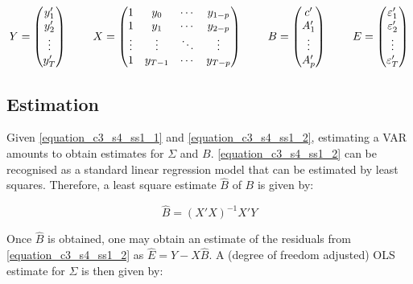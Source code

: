 \begin{equation}
Y = \left( \begin{matrix} y_1' \\ y_2' \\ \vdots \\ y_T' \end{matrix} \right) \hspace{8mm}
X = \left( \begin{matrix} 1 & y_0 & \cdots & y_{1-p} \\ 1 & y_1 & \cdots & y_{2-p} \\ \vdots & \vdots & \ddots & \vdots \\ 1 & y_{T-1} & \cdots & y_{T-p} \end{matrix} \right) \hspace{8mm}
B = \left( \begin{matrix} c' \\ A_1' \\ \vdots \\ A_p' \end{matrix} \right) \hspace{8mm}
E = \left( \begin{matrix} \varepsilon_1' \\ \varepsilon_2' \\ \vdots \\ \varepsilon_T' \end{matrix} \right)
\label{equation_c3_s4_ss1_3}
\end{equation}

\newpage

\subsection{Estimation}
\label{chapter3_section4_subsection2}


Given \ref{equation_c3_s4_ss1_1} and \ref{equation_c3_s4_ss1_2}, estimating a VAR amounts to obtain estimates for $\Sigma$ and $B$. \ref{equation_c3_s4_ss1_2} can be recognised as a standard linear regression model that can be estimated by least squares. Therefore, a least square estimate $\hat{B}$ of $B$ is given by:

\begin{equation}
\hat{B} = (X'X)^{-1} X'Y
\label{equation_c3_s4_ss2_1}
\end{equation}

Once $\hat{B}$ is obtained, one may obtain an estimate of the residuals from \ref{equation_c3_s4_ss1_2} as $\hat{E} = Y - X \hat{B}$. A (degree of freedom adjusted) OLS estimate for $\Sigma$ is then given by:

